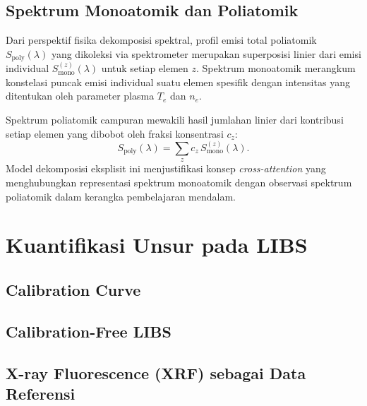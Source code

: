 \subsection{Spektrum Monoatomik dan Poliatomik}

Dari perspektif fisika dekomposisi spektral, profil emisi total poliatomik $S_{\text{poly}}(\lambda)$ yang dikoleksi via spektrometer merupakan superposisi linier dari emisi individual $S_{\text{mono}}^{(z)}(\lambda)$ untuk setiap elemen $z$. Spektrum monoatomik merangkum konstelasi puncak emisi individual suatu elemen spesifik dengan intensitas yang ditentukan oleh parameter plasma $T_e$ dan $n_e$.

Spektrum poliatomik campuran mewakili hasil jumlahan linier dari kontribusi setiap elemen yang dibobot oleh fraksi konsentrasi $c_z$:
\begin{equation} \label{eq:bab2_poly}
S_{\mathrm{poly}}(\lambda) = \sum_{z} c_z \, S_{\mathrm{mono}}^{(z)}(\lambda).
\end{equation}
Model dekomposisi eksplisit ini menjustifikasi konsep \textit{cross-attention} yang menghubungkan representasi spektrum monoatomik dengan observasi spektrum poliatomik dalam kerangka pembelajaran mendalam.

\section{Kuantifikasi Unsur pada LIBS}

\subsection{Calibration Curve}

\subsection{Calibration-Free LIBS}

\subsection{X-ray Fluorescence (XRF) sebagai Data Referensi}

